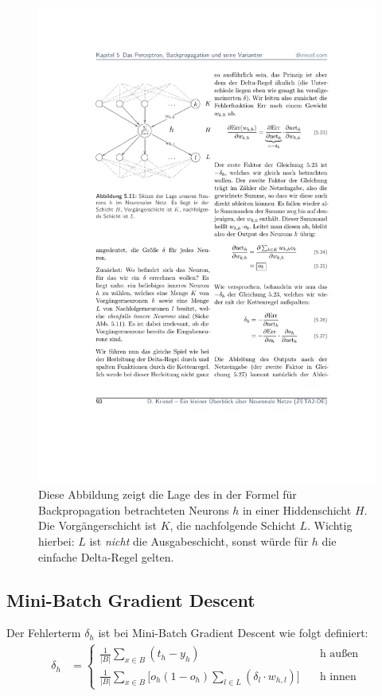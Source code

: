 \begin{figure}[ht!] \centering 
	\includegraphics[width=\linewidth]{figures/ch03_mlp-backpropagation.pdf}
	\caption{Diese Abbildung zeigt die Lage des in der Formel für Backpropagation betrachteten Neurons $h$ in einer Hiddenschicht $H$. Die Vorgängerschicht ist $K$, die nachfolgende Schicht $L$. Wichtig hierbei: $L$ ist \emph{nicht} die Ausgabeschicht, sonst würde für $h$ die einfache Delta-Regel gelten.}
	\label{fig:ch03_fehlerflaeche}
\end{figure}

\subsection*{Mini-Batch Gradient Descent}
Der Fehlerterm $\delta_h$ ist bei Mini-Batch Gradient Descent wie folgt definiert:
\begin{align*}
	\delta_h &=
	\begin{cases}
		\frac{1}{|B|} \sum_{x \in B} (t_h - y_h) 
		\quad &\text{h außen} \\
		\frac{1}{|B|} \sum_{x \in B} \big[
			o_h(1 - o_h)
			\sum_{l \in L} (\delta_l \cdot w_{h,l})
		\big] 
		\quad &\text{h innen}
	\end{cases}
\end{align*}



